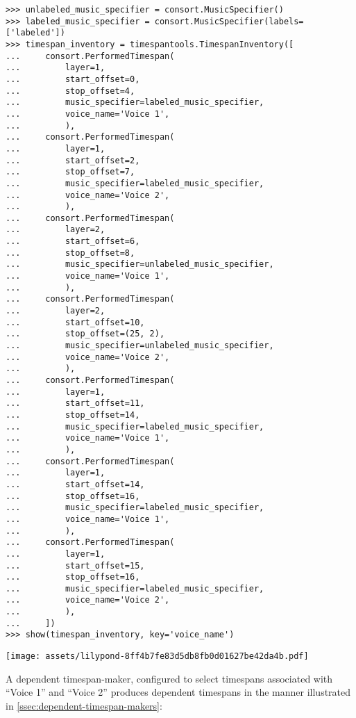 \begin{abjadbookoutput}
\begin{singlespacing}
\vspace{-0.5\baselineskip}
\begin{lstlisting}
>>> unlabeled_music_specifier = consort.MusicSpecifier()
>>> labeled_music_specifier = consort.MusicSpecifier(labels=['labeled'])
>>> timespan_inventory = timespantools.TimespanInventory([
...     consort.PerformedTimespan(
...         layer=1,
...         start_offset=0,
...         stop_offset=4,
...         music_specifier=labeled_music_specifier,
...         voice_name='Voice 1',
...         ),
...     consort.PerformedTimespan(
...         layer=1,
...         start_offset=2,
...         stop_offset=7,
...         music_specifier=labeled_music_specifier,
...         voice_name='Voice 2',
...         ),
...     consort.PerformedTimespan(
...         layer=2,
...         start_offset=6,
...         stop_offset=8,
...         music_specifier=unlabeled_music_specifier,
...         voice_name='Voice 1',
...         ),
...     consort.PerformedTimespan(
...         layer=2,
...         start_offset=10,
...         stop_offset=(25, 2),
...         music_specifier=unlabeled_music_specifier,
...         voice_name='Voice 2',
...         ),
...     consort.PerformedTimespan(
...         layer=1,
...         start_offset=11,
...         stop_offset=14,
...         music_specifier=labeled_music_specifier,
...         voice_name='Voice 1',
...         ),
...     consort.PerformedTimespan(
...         layer=1,
...         start_offset=14,
...         stop_offset=16,
...         music_specifier=labeled_music_specifier,
...         voice_name='Voice 1',
...         ),
...     consort.PerformedTimespan(
...         layer=1,
...         start_offset=15,
...         stop_offset=16,
...         music_specifier=labeled_music_specifier,
...         voice_name='Voice 2',
...         ),
...     ])
>>> show(timespan_inventory, key='voice_name')
\end{lstlisting}
\noindent\texttt{[image: assets/lilypond-8ff4b7fe83d5db8fb0d01627be42da4b.pdf]}
\end{singlespacing}
\end{abjadbookoutput}

\noindent A dependent timespan-maker, configured to select timespans associated
with \enquote{Voice 1} and \enquote{Voice 2} produces dependent timespans in
the manner illustrated in \autoref{ssec:dependent-timespan-makers}:

\begin{comment}
<abjad>
dependent_timespan_maker = consort.DependentTimespanMaker(
    include_inner_starts=True,
    voice_names=('Voice 1', 'Voice 2'),
    )
result = dependent_timespan_maker(
    layer=3,
    music_specifiers={'Voice 3': None},
    timespan_inventory=timespan_inventory[:],
    )
show(result, key='voice_name')
</abjad>
\end{comment}

